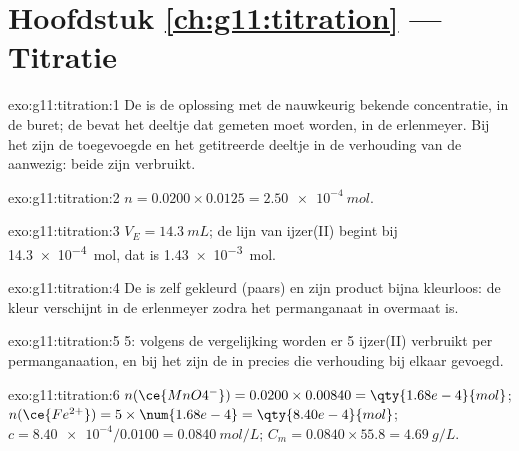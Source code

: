 \section*{Hoofdstuk \ref{ch:g11:titration} --- Titratie}

\begin{solution}{exo:g11:titration:1}
De  is de oplossing met de nauwkeurig bekende concentratie, in de
buret; de  bevat het deeltje dat gemeten moet
worden, in de erlenmeyer. Bij het  zijn de toegevoegde
 en het getitreerde deeltje in de verhouding van de
 aanwezig: beide zijn verbruikt.
\end{solution}

\begin{solution}{exo:g11:titration:2}
$n = 0.0200 \times 0.0125 = \qty{2.50e-4}{mol}$.
\end{solution}

\begin{solution}{exo:g11:titration:3}
$V_E = \qty{14.3}{mL}$; de lijn van ijzer(II) begint bij
\qty{14.3e-4}{mol}, dat is \qty{1.43e-3}{mol}.
\end{solution}

\begin{solution}{exo:g11:titration:4}
De  is zelf gekleurd (paars) en zijn product bijna kleurloos: de
kleur verschijnt in de erlenmeyer zodra het permanganaat in overmaat is.
\end{solution}

\begin{solution}{exo:g11:titration:5}
5: volgens de vergelijking worden er 5 ijzer(II) verbruikt per
permanganaation, en bij het  zijn de  in
precies die verhouding bij elkaar gevoegd.
\end{solution}

\begin{solution}{exo:g11:titration:6}
$n(\ce{MnO4^-}) = 0.0200 \times 0.00840 = \qty{1.68e-4}{mol}$;
$n(\ce{Fe^{2+}}) = 5 \times \num{1.68e-4} = \qty{8.40e-4}{mol}$;
$c = \num{8.40e-4} / 0.0100 = \qty{0.0840}{mol/L}$;
$C_m = 0.0840 \times 55.8 = \qty{4.69}{g/L}$.
\end{solution}

